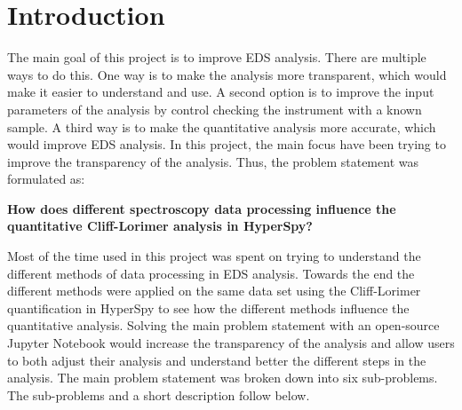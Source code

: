 \chapter{Introduction}
\label{chap:introduction}

%
%
The main goal of this project is to improve EDS analysis. There are multiple ways to do this.
One way is to make the analysis more transparent, which would make it easier to understand and use.
A second option is to improve the input parameters of the analysis by control checking the instrument with a known sample.
A third way is to make the quantitative analysis more accurate, which would improve EDS analysis.
In this project, the main focus have been trying to improve the transparency of the analysis. Thus, the problem statement was formulated as:


\begin{mainprob}
    \label{mainproblem}
    \textbf{How does different spectroscopy data processing influence the quantitative Cliff-Lorimer analysis in HyperSpy?}
\end{mainprob}

Most of the time used in this project was spent on trying to understand the different methods of data processing in EDS analysis.
Towards the end the different methods were applied on the same data set using the Cliff-Lorimer quantification in HyperSpy to see how the different methods influence the quantitative analysis.
Solving the main problem statement with an open-source Jupyter Notebook would increase the transparency of the analysis and allow users to both adjust their analysis and understand better the different steps in the analysis.
The main problem statement was broken down into six sub-problems.
The sub-problems and a short description follow below.



